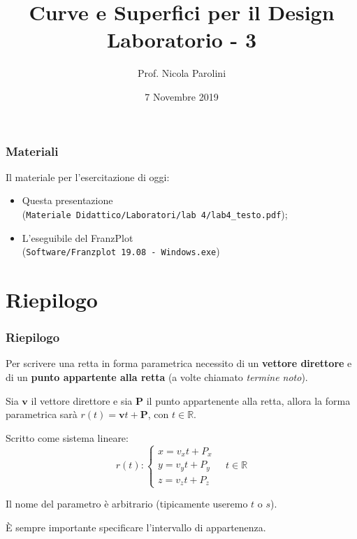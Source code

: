 \documentclass{beamer}
\title[Curve e Sup. - Lab 3]{Curve e Superfici per il Design \\ Laboratorio - 3}
\author[Prof. Parolini]{Prof. Nicola Parolini}
\date{7 Novembre 2019}
\newcommand{\frnzplt}{FranzPlot }
\begin{document}
\begin{frame}
\frametitle{Materiali}
Il materiale per l'esercitazione di oggi:
\begin{itemize}
\item Questa presentazione \\ (\texttt{Materiale Didattico/Laboratori/lab 4/lab4\_testo.pdf});
\item L'eseguibile del \frnzplt \\ (\texttt{Software/Franzplot 19.08 - Windows.exe})
\end{itemize}
\end{frame}


\section{Riepilogo}

\begin{frame}
\frametitle{Riepilogo}
    Per scrivere una retta in forma parametrica necessito di un \textbf{vettore direttore}
    e di un \textbf{punto appartente alla retta} (a volte chiamato \textit{termine noto}).

    \vspace{0.2cm}
    Sia $\mathbf v$ il vettore direttore e sia $\mathbf P$ il punto appartenente alla retta,
    allora la forma parametrica sar\`a $r(t) = \mathbf v t + \mathbf P$, con $t\in \mathbb{R}$.
    
    Scritto come sistema lineare:
\begin{displaymath}
    r(t) :\begin{cases} x = v_x t + P_x\\ y = v_y t + P_y \\z = v_z t + P_z \end{cases}
\quad t\in \mathbb{R}
\end{displaymath}

    \vspace{0.2cm}
    Il nome del parametro \`e arbitrario (tipicamente useremo $t$ o $s$).
    
    \`E sempre importante specificare l'intervallo di appartenenza.
\end{frame}
\end{document}

